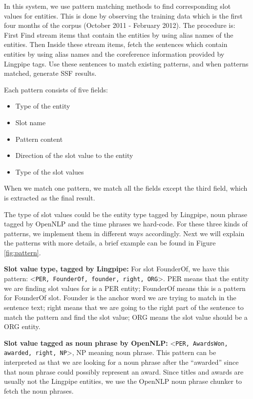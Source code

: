 In this system, we use pattern matching methods to find corresponding slot 
values for entities. This is done by observing the training data which is the first four months of the corpus (October 2011 - February 2012). The procedure is: First Find stream items that contain the 
entities by using alias names of the entities. Then Inside these stream items, 
fetch the sentences which contain entities by using alias names and the 
coreference information provided by Lingpipe tags. Use these sentences to 
match existing patterns, and when patterns matched, generate SSF results.

Each pattern consists of five fields:

\begin{itemize}
\item Type of the entity
\item Slot name
\item Pattern content
\item Direction of the slot value to the entity
\item Type of the slot values
\end{itemize}

 When we match one pattern, we match all the 
fields except the third field, which is extracted as the final result.

 The type of slot values could be the entity 
type tagged by Lingpipe, noun phrase tagged by OpenNLP and the time phrases we 
hard-code. For these three kinds of patterns, we implement them in different 
ways accordingly. Next we will explain the patterns with more details, a brief example can be found in Figure \ref{fig:pattern}. 

\textbf{Slot value type, tagged by Lingpipe:} For slot FounderOf, we have this
pattern: \textless \texttt{PER, FounderOf, founder, right, ORG}\textgreater. PER means 
that the entity we are finding slot values for is a PER entity; FounderOf 
means this is a pattern for FounderOf slot. Founder is the anchor word we are 
trying to match in the sentence text; right means that we are going to the 
right part of the sentence to match the pattern and find the slot value; ORG 
means the slot value should be a ORG entity.

\textbf{Slot value tagged as noun phrase by OpenNLP:} \textless \texttt{PER, AwardsWon, awarded, 
right, NP}\textgreater, NP meaning noun phrase. This pattern can be interpreted 
as that we are looking for a noun phrase after the “awarded'' since that noun 
phrase could possibly represent an award. Since titles and awards are usually 
not the Lingpipe entities, we use the OpenNLP noun phrase chunker to fetch the 
noun phrases.

